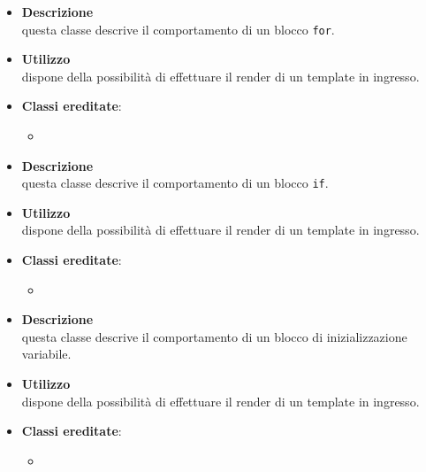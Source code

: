 \label{\nogloxy{swedesigner::server::project::ParsedFor}}
\begin{itemize}
\item \textbf{Descrizione}\\
questa classe descrive il comportamento di un blocco \texttt{for}.
\item \textbf{Utilizzo}\\
dispone della possibilità di effettuare il render di un template in ingresso.
\item \textbf{Classi ereditate}:
\begin{itemize}
\item \hyperref[\nogloxy{swedesigner::server::project::ParsedInstruction}]{}
\end{itemize}
\end{itemize}

\label{\nogloxy{swedesigner::server::project::ParsedIf}}
\begin{itemize}
\item \textbf{Descrizione}\\
questa classe descrive il comportamento di un blocco \texttt{if}.
\item \textbf{Utilizzo}\\
dispone della possibilità di effettuare il render di un template in ingresso.
\item \textbf{Classi ereditate}:
\begin{itemize}
\item \hyperref[\nogloxy{swedesigner::server::project::ParsedInstruction}]{}
\end{itemize}
\end{itemize}

\label{\nogloxy{swedesigner::server::project::ParsedInitialize}}
\begin{itemize}
\item \textbf{Descrizione}\\
questa classe descrive il comportamento di un blocco di inizializzazione variabile.
\item \textbf{Utilizzo}\\
dispone della possibilità di effettuare il render di un template in ingresso.
\item \textbf{Classi ereditate}:
\begin{itemize}
\item \hyperref[\nogloxy{swedesigner::server::project::ParsedInstruction}]{}
\end{itemize}
\end{itemize}

